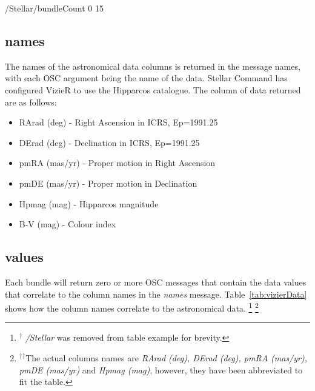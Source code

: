 \begin{syntax}
	/Stellar/bundleCount 0 15
\end{syntax}
\bigskip

\subsection{names}
The names of the astronomical data columns is returned in the message names, with each OSC argument being the name of the  data. Stellar Command has configured VizieR to use the Hipparcos catalogue. The column of data returned are as follows: 

\begin{itemize}
	\item RArad (deg) -  Right Ascension in ICRS, Ep=1991.25 
	\item DErad (deg) -  Declination in ICRS, Ep=1991.25
	\item pmRA (mas/yr) -  Proper motion in Right Ascension
	\item pmDE (mas/yr) - Proper motion in Declination 
	\item Hpmag (mag) - Hipparcos magnitude
	\item B-V (mag) -  Colour index
\end{itemize}

\subsection{values}
Each bundle will return zero or more OSC messages that contain the data values that correlate to the column names in the \textit{names} message. Table~\ref{tab:vizierData} shows how the column names correlate to the astronomical data. \footnote{\textsuperscript{$\dagger$} \textit{/Stellar} was removed from table example for brevity.} \footnote{\textsuperscript{$\dagger$$\dagger$}The actual columns names are \textit{RArad (deg),  DErad (deg), pmRA (mas/yr), pmDE (mas/yr)} and \textit{Hpmag (mag)}, however, they have been abbreviated to fit the table.}


